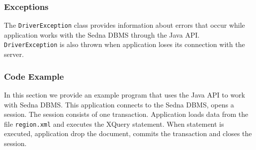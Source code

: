 \documentclass[a4paper,12pt]{article}
\begin{document}
\subsubsection{Exceptions}

The \verb!DriverException! class provides information about errors that occur
while application works with the Sedna DBMS through the Java API.
\verb!DriverException! is also thrown when application loses its connection with
the server.


\subsubsection{Code Example}
\label{java-example}

In this section we provide an example program that uses the Java API to work
with Sedna DBMS. This application connects to the Sedna DBMS, opens a session.
The session consists of one transaction. Application loads data from the file
\verb!region.xml! and executes the XQuery statement. When statement is executed,
application drop the document, commits the transaction and closes the session.
\end{document}
